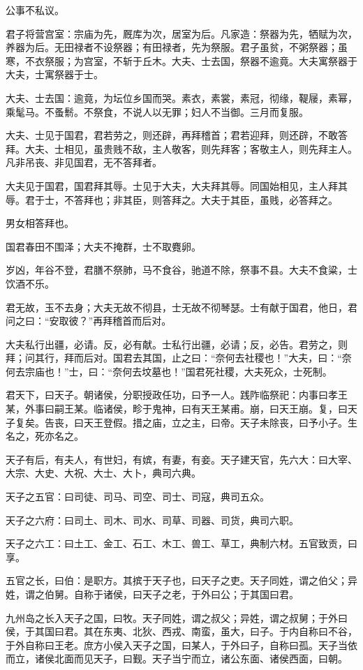 \documentclass[]{article}
\begin{document}
公事不私议。

君子将营宫室：宗庙为先，厩库为次，居室为后。凡家造：祭器为先，牺赋为次，养器为后。无田禄者不设祭器；有田禄者，先为祭服。君子虽贫，不粥祭器；虽寒，不衣祭服；为宫室，不斩于丘木。大夫、士去国，祭器不逾竟。大夫寓祭器于大夫，士寓祭器于士。

大夫、士去国：逾竟，为坛位乡国而哭。素衣，素裳，素冠，彻缘，鞮屦，素幂，乘髦马。不蚤鬋。不祭食，不说人以无罪；妇人不当御。三月而复服。

大夫、士见于国君，君若劳之，则还辟，再拜稽首；君若迎拜，则还辟，不敢答拜。大夫、士相见，虽贵贱不敌，主人敬客，则先拜客；客敬主人，则先拜主人。凡非吊丧、非见国君，无不答拜者。

大夫见于国君，国君拜其辱。士见于大夫，大夫拜其辱。同国始相见，主人拜其辱。君于士，不答拜也；非其臣，则答拜之。大夫于其臣，虽贱，必答拜之。

男女相答拜也。

国君春田不围泽；大夫不掩群，士不取麑卵。

岁凶，年谷不登，君膳不祭肺，马不食谷，驰道不除，祭事不县。大夫不食粱，士饮酒不乐。

君无故，玉不去身；大夫无故不彻县，士无故不彻琴瑟。士有献于国君，他日，君问之曰：``安取彼？''再拜稽首而后对。

大夫私行出疆，必请。反，必有献。士私行出疆，必请；反，必告。君劳之，则拜；问其行，拜而后对。国君去其国，止之曰：``奈何去社稷也！''大夫，曰：``奈何去宗庙也！''士，曰：``奈何去坟墓也！''国君死社稷，大夫死众，士死制。

君天下，曰天子。朝诸侯，分职授政任功，曰予一人。践阼临祭祀：内事曰孝王某，外事曰嗣王某。临诸侯，畛于鬼神，曰有天王某甫。崩，曰天王崩。复，曰天子复矣。告丧，曰天王登假。措之庙，立之主，曰帝。天子未除丧，曰予小子。生名之，死亦名之。

天子有后，有夫人，有世妇，有嫔，有妻，有妾。天子建天官，先六大：曰大宰、大宗、大史、大祝、大士、大卜，典司六典。

天子之五官：曰司徒、司马、司空、司士、司寇，典司五众。

天子之六府：曰司土、司木、司水、司草、司器、司货，典司六职。

天子之六工：曰土工、金工、石工、木工、兽工、草工，典制六材。五官致贡，曰享。

五官之长，曰伯：是职方。其摈于天子也，曰天子之吏。天子同姓，谓之伯父；异姓，谓之伯舅。自称于诸侯，曰天子之老，于外曰公；于其国曰君。

九州岛之长入天子之国，曰牧。天子同姓，谓之叔父；异姓，谓之叔舅；于外曰侯，于其国曰君。其在东夷、北狄、西戎、南蛮，虽大，曰子。于内自称曰不谷，于外自称曰王老。庶方小侯入天子之国，曰某人，于外曰子，自称曰孤。天子当依而立，诸侯北面而见天子，曰觐。天子当宁而立，诸公东面、诸侯西面，曰朝。
\end{document}

